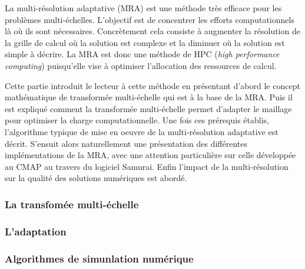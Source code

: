 La multi-résolution adaptative (MRA) est une méthode très efficace pour les problèmes multi-échelles. 
L'objectif est de concentrer les efforts computationnels là où ils sont nécessaires. 
Concrètement cela consiste à augmenter la résolution de la grille de calcul où la solution est complexe et la diminuer où la solution est simple à décrire.
La MRA est donc une méthode de HPC (\textit{high performance computing}) puisqu'elle vise à optimiser l'allocation des ressources de calcul.\par
Cette partie introduit le lecteur à cette méthode en présentant d'abord le concept mathématique de transformée multi-échelle qui est à la base de la MRA. 
Puis il est expliqué comment la transformée multi-échelle permet d'adapter le maillage pour optimiser la charge computationnelle.
Une fois ces prérequis établis, l'algorithme typique de mise en oeuvre de la multi-résolution adaptative est décrit.
S’ensuit alors naturellement une présentation des différentes implémentations de la MRA, avec une attention particulière sur celle développée au CMAP au travers 
du logiciel Samurai.
Enfin l'impact de la multi-résolution sur la qualité des solutions numériques est abordé. 
\subsubsection{La transfomée multi-échelle}
    \paragraph{}
    \paragraph{}
\subsubsection{L'adaptation}
    \paragraph{}
    \paragraph{}
\subsubsection{Algorithmes de simunlation numérique}
